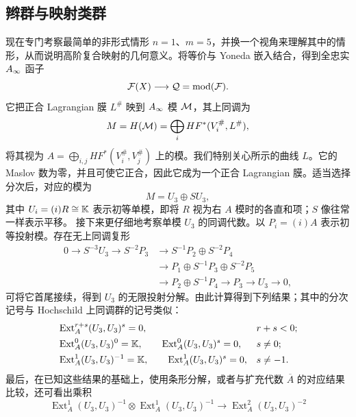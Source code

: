 \subsection{辫群与映射类群}\label{sec:20f}
现在专门考察最简单的非形式情形 $n=1$、$m=5$，并换一个视角来理解其中的情形，从而说明高阶复合映射的几何意义。将等价与 Yoneda 嵌入结合，得到全忠实 $A_\infty$ 函子
\begin{equation}\label{eq:20.18}
\mathcal F(X)\longrightarrow\mathcal Q=\operatorname{mod}(\mathcal F).
\end{equation}
它把正合 Lagrangian 膜 $L^\#$ 映到 $A_\infty$ 模 $\mathcal M$，其上同调为
\[
M=H(\mathcal M)=\bigoplus_i HF^*(V_i^\#,L^\#),
\]
将其视为 $A=\bigoplus_{i,j}HF^*(V_i^\#,V_j^\#)$ 上的模。我们特别关心所示的曲线 $L$。它的 Maslov 数为零，并且可使它正合，因此它成为一个正合 Lagrangian 膜。适当选择分次后，对应的模为
\[
M=U_3\oplus SU_3,
\]
其中 $U_i=(i)R\cong\mathbb K$ 表示初等单模，即将 $R$ 视为右 $A$ 模时的各直和项；$S$ 像往常一样表示平移。
接下来更仔细地考察单模 $U_3$ 的同调代数。以 $P_i=(i)A$ 表示初等投射模。存在无上同调复形
\[
\begin{aligned}
0\longrightarrow S^{-3}U_3\longrightarrow S^{-2}P_3
&\longrightarrow S^{-1}P_2\oplus S^{-2}P_4\\
&\longrightarrow P_1\oplus S^{-1}P_3\oplus S^{-2}P_5\\
&\longrightarrow P_2\oplus S^{-1}P_4\longrightarrow P_3\longrightarrow U_3\longrightarrow0,
\end{aligned}
\]
可将它首尾接续，得到 $U_3$ 的无限投射分解。由此计算得到下列结果；其中的分次记号与 Hochschild 上同调群的记号类似：
\begin{equation}\label{eq:20.19}
\begin{aligned}
&\operatorname{Ext}_{A}^{r+s}(U_3,U_3)^s=0,
&&r+s<0;\\
&\operatorname{Ext}_{A}^{0}(U_3,U_3)^0=\mathbb K,\qquad
\operatorname{Ext}_{A}^{0}(U_3,U_3)^s=0,
&&s\ne0;\\
&\operatorname{Ext}_{A}^{1}(U_3,U_3)^{-1}=\mathbb K,\qquad
\operatorname{Ext}_{A}^{1}(U_3,U_3)^s=0,
&&s\ne-1.
\end{aligned}
\end{equation}
最后，在已知这些结果的基础上，使用条形分解，或者与扩充代数 $\overline A$ 的对应结果比较，还可看出乘积
\begin{equation}\label{eq:20.20}
\operatorname{Ext}_{A}^{1}(U_3,U_3)^{-1}\otimes
\operatorname{Ext}_{A}^{1}(U_3,U_3)^{-1}
\longrightarrow\operatorname{Ext}_{A}^{2}(U_3,U_3)^{-2}
\end{equation}
